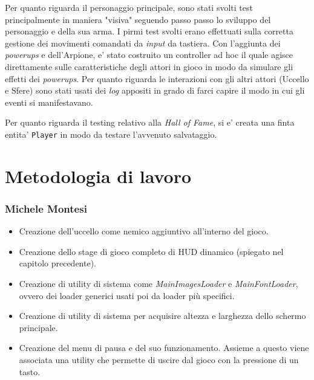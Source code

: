 \documentclass[a4paper,12pt]{report}
\begin{document}
Per quanto riguarda il personaggio principale, sono stati svolti test principalmente in maniera "visiva" seguendo passo passo lo sviluppo del personaggio e della sua arma. I pirmi test svolti erano effettuati sulla corretta gestione dei movimenti comandati da \emph{input} da tastiera. Con l'aggiunta dei \emph{powerups} e dell'Arpione, e' stato costruito un controller ad hoc il quale agisce direttamente sulle caratteristiche degli attori in gioco in modo da simulare gli effetti dei \emph{powerups}.
Per quanto riguarda le interazioni con gli altri attori (Uccello e Sfere) sono stati usati dei \emph{log} appositi in grado di farci capire il modo in cui gli eventi si manifestavano.

Per quanto riguarda il testing relativo alla \emph{Hall of Fame}, si e' creata una finta entita' \texttt{Player} in modo da testare l'avvenuto salvataggio.

\section{Metodologia di lavoro}
\subsubsection{Michele Montesi}
\begin{itemize}
    \item Creazione dell’uccello come nemico aggiuntivo all’interno del gioco.
    \item Creazione dello stage di gioco completo di HUD dinamico (spiegato nel capitolo precedente). 
    \item Creazione di utility di sistema come \emph{MainImagesLoader} e \emph{MainFontLoader}, ovvero dei loader generici usati poi da loader più specifici.
    \item Creazione di utility di sistema per acquisire altezza e larghezza dello schermo principale.
    \item Creazione del menu di pausa e del suo funzionamento. Assieme a questo viene associata una utility che permette di uscire dal gioco con la pressione di un tasto.
\end{itemize}
\end{document}
